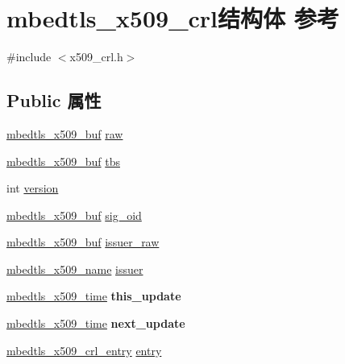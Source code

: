\hypertarget{structmbedtls__x509__crl}{}\section{mbedtls\+\_\+x509\+\_\+crl结构体 参考}
\label{structmbedtls__x509__crl}


{\ttfamily \#include $<$x509\+\_\+crl.\+h$>$}

\subsection*{Public 属性}
\begin{DoxyCompactItemize}
\item 
\hyperlink{group__x509__module_ga4d02c9e8e4e2934555e0d132cd2976dc}{mbedtls\+\_\+x509\+\_\+buf} \hyperlink{structmbedtls__x509__crl_a6fb756d2b65237ccaff6061f4217b2eb}{raw}
\item 
\hyperlink{group__x509__module_ga4d02c9e8e4e2934555e0d132cd2976dc}{mbedtls\+\_\+x509\+\_\+buf} \hyperlink{structmbedtls__x509__crl_ab8086dd1a2a3d82363cc91e1cdfb5850}{tbs}
\item 
int \hyperlink{structmbedtls__x509__crl_aaf0d47225a63a5d9bf0e2e99d641e72d}{version}
\item 
\hyperlink{group__x509__module_ga4d02c9e8e4e2934555e0d132cd2976dc}{mbedtls\+\_\+x509\+\_\+buf} \hyperlink{structmbedtls__x509__crl_ad21b69052f214be907ceb84a9274b9f2}{sig\+\_\+oid}
\item 
\hyperlink{group__x509__module_ga4d02c9e8e4e2934555e0d132cd2976dc}{mbedtls\+\_\+x509\+\_\+buf} \hyperlink{structmbedtls__x509__crl_a009d0e1b844df85a2389ec10b770a6f6}{issuer\+\_\+raw}
\item 
\hyperlink{group__x509__module_ga2272228c7776102328df31623af3168c}{mbedtls\+\_\+x509\+\_\+name} \hyperlink{structmbedtls__x509__crl_aae988566d13fadf805d8ad31d13b44d8}{issuer}
\item 
\mbox{\label{structmbedtls__x509__crl_a61c51dd535f4f954e04f5de02fe1065e}} 
\hyperlink{structmbedtls__x509__time}{mbedtls\+\_\+x509\+\_\+time} {\bfseries this\+\_\+update}
\item 
\mbox{\label{structmbedtls__x509__crl_a87b72e6cb62919b6172d3f100b9d09ea}} 
\hyperlink{structmbedtls__x509__time}{mbedtls\+\_\+x509\+\_\+time} {\bfseries next\+\_\+update}
\item 
\hyperlink{structmbedtls__x509__crl__entry}{mbedtls\+\_\+x509\+\_\+crl\+\_\+entry} \hyperlink{structmbedtls__x509__crl_a880036b1b4a2b449542f8f1fa389694f}{entry}

\end{DoxyCompactItemize}
